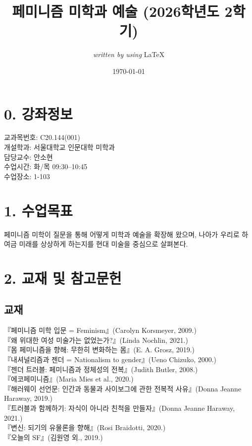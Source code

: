 \documentclass{article}
\begin{document}
\title{페미니즘 미학과 예술 (2026학년도 2학기)}
\author{\textit{written by using} \LaTeX}
\date{\today}
\maketitle
\thispagestyle{fancy}
\setcounter{secnumdepth}{0}
\bigskip

\section{0. 강좌정보}
\medskip
교과목번호: C20.144(001)\\
개설학과: 서울대학교 인문대학 미학과\\
담당교수: 안소현\\
수업시간: 화/목 09:30--10:45\\
수업장소: 1-103

\bigskip
\section{1. 수업목표}
\medskip
페미니즘 미학이 질문을 통해 어떻게 미학과 예술을 확장해 왔으며, 나아가 우리로 하여금 미래를 상상하게 하는지를 현대 미술을 중심으로 살펴본다.

\bigskip
\section{2. 교재 및 참고문헌}
\medskip
\subsection{교재}
『페미니즘 미학 입문 = Feminism』(Carolyn Korsmeyer, 2009.)\\
『왜 위대한 여성 미술가는 없었는가?』(Linda Nochlin, 2021.)\\
『몸 페미니즘을 향해: 무한히 변화하는 몸』(E. A. Grosz, 2019.)\\
『내셔널리즘과 젠더 = Nationalism to gender』(Ueno Chizuko, 2000.)\\
『젠더 트러블: 페미니즘과 정체성의 전복』(Judith Butler, 2008.)\\
『에코페미니즘』(Maria Mies et al., 2020.)\\
『해러웨이 선언문: 인간과 동물과 사이보그에 관한 전복적 사유』(Donna Jeanne Haraway, 2019.)\\
『트러블과 함께하기: 자식이 아니라 친척을 만들자』(Donna Jeanne Haraway, 2021.)\\
『변신: 되기의 유물론을 향해』(Rosi Braidotti, 2020.)\\
『오늘의 SF』(김원영 외., 2019.)
\end{document}

